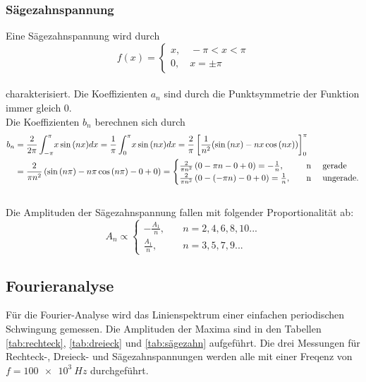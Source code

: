 \subsubsection{Sägezahnspannung}
Eine Sägezahnspannung wird durch
\begin{equation*}
  f(x)=\begin{cases}
  x, \quad -\pi < x < \pi\\
  0, \quad x=\pm \pi
  \end{cases}
\end{equation*}
\\charakterisiert. Die Koeffizienten $a_{n}$ sind durch die Punktsymmetrie der Funktion immer gleich 0.
\\Die Koeffizienten $b_{n}$ berechnen sich durch
\begin{align*}
  b_{n}
  &=\frac{2}{2\pi} \int_{-\pi}^{\pi} \! x \sin{(nx)} dx
   =\frac{1}{\pi} \int_{0}^{\pi} \! x \sin{(nx)} dx
   =\frac{2}{\pi} \left[ \frac{1}{n^2}(\sin{(nx)}-nx \cos{(nx)}) \right]_{0}^{\pi}\\
  &=\frac{2}{\pi n^2} \left( \sin{(n \pi)} - n \pi \cos{(n \pi)} - 0 +0 \right)
   =\begin{cases}
    \frac{2}{\pi n^2} \left( 0 - \pi n - 0 +0 \right) = -\frac{1}{n},          \quad &\text{n  \quad gerade}\\
    \frac{2}{\pi n^2} \left( 0 - (-\pi n) - 0 +0 \right) = \frac{1}{n},       \quad &\text{n  \quad ungerade.}\\
  \end{cases}
\end{align*}
\\Die Amplituden der Sägezahnspannung fallen mit folgender Proportionalität ab:
\begin{equation}
  A_{n} \propto
    \begin{cases}
      -\frac{A_{1}}{n},   \quad &n= 2, 4, 6, 8, 10...\\
      \frac{A_{1}}{n},  \quad &n= 3, 5, 7, 9...
    \end{cases}
\end{equation}


\subsection{Fourieranalyse}
Für die Fourier-Analyse wird das Linienspektrum einer einfachen periodischen Schwingung gemessen.
Die Amplituden der Maxima sind in den Tabellen \ref{tab:rechteck}, \ref{tab:dreieck} und \ref{tab:sägezahn} aufgeführt.
Die drei Messungen für Rechteck-, Dreieck- und Sägezahnspannungen werden alle mit einer Freqenz von $f = \SI{100e3}{Hz}$ durchgeführt.

